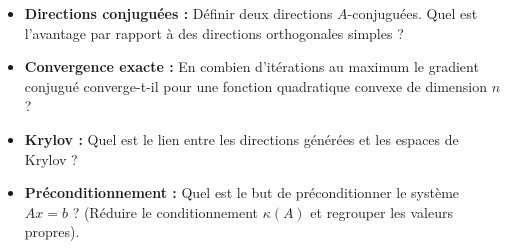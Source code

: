 \bigskip
\begin{checkpoint}
\begin{itemize}
    \item \textbf{Directions conjuguées :} Définir deux directions $A$-conjuguées. Quel est l'avantage par rapport à des directions orthogonales simples ?
    \item \textbf{Convergence exacte :} En combien d'itérations au maximum le gradient conjugué converge-t-il pour une fonction quadratique convexe de dimension $n$ ?
    \item \textbf{Krylov :} Quel est le lien entre les directions générées et les espaces de Krylov ?
    \item \textbf{Préconditionnement :} Quel est le but de préconditionner le système $Ax=b$ ? (Réduire le conditionnement $\kappa(A)$ et regrouper les valeurs propres).
\end{itemize}
\end{checkpoint}


